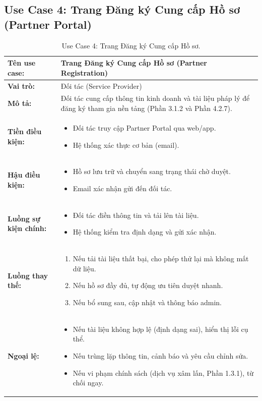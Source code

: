 \subsection{Use Case 4: Trang Đăng ký Cung cấp Hồ sơ (Partner Portal)}

\begin{table}[H]
\centering
\begin{tabular}{|p{3cm}|p{12cm}|}
\hline
\textbf{Tên use case:} & Trang Đăng ký Cung cấp Hồ sơ (Partner Registration) \\
\hline
\textbf{Vai trò:} & Đối tác (Service Provider) \\
\hline
\textbf{Mô tả:} & Đối tác cung cấp thông tin kinh doanh và tài liệu pháp lý để đăng ký tham gia nền tảng (Phần 3.1.2 và Phần 4.2.7). \\
\hline
\textbf{Tiền điều kiện:} & 
\begin{itemize}
\item Đối tác truy cập Partner Portal qua web/app.
\item Hệ thống xác thực cơ bản (email).
\end{itemize} \\
\hline
\textbf{Hậu điều kiện:} & 
\begin{itemize}
\item Hồ sơ lưu trữ và chuyển sang trạng thái chờ duyệt.
\item Email xác nhận gửi đến đối tác.
\end{itemize} \\
\hline
\textbf{Luồng sự kiện chính:} & 
\begin{itemize}
\item Đối tác điền thông tin và tải lên tài liệu.
\item Hệ thống kiểm tra định dạng và gửi xác nhận.
\end{itemize} \\
\hline
\textbf{Luồng thay thế:} & 
\begin{enumerate}
\item[a.] Nếu tải tài liệu thất bại, cho phép thử lại mà không mất dữ liệu.
\item[b.] Nếu hồ sơ đầy đủ, tự động ưu tiên duyệt nhanh.
\item[c.] Nếu bổ sung sau, cập nhật và thông báo admin.
\end{enumerate} \\
\hline
\textbf{Ngoại lệ:} & 
\begin{itemize}
\item Nếu tài liệu không hợp lệ (định dạng sai), hiển thị lỗi cụ thể.
\item Nếu trùng lặp thông tin, cảnh báo và yêu cầu chỉnh sửa.
\item Nếu vi phạm chính sách (dịch vụ xâm lấn, Phần 1.3.1), từ chối ngay.
\end{itemize} \\
\hline
\end{tabular}
\caption{Use Case 4: Trang Đăng ký Cung cấp Hồ sơ.}
\label{tab:uc4}
\end{table}

